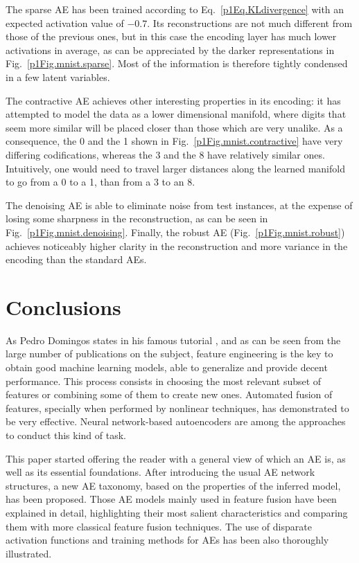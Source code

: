 The sparse AE has been trained according to Eq.~\ref{p1Eq.KLdivergence} with an expected activation value of $-0.7$. Its reconstructions are not much different from those of the previous ones, but in this case the encoding layer has much lower activations in average, as can be appreciated by the darker representations in  Fig.~\ref{p1Fig.mnist.sparse}. Most of the information is therefore tightly condensed in a few latent variables.

The contractive AE achieves other interesting properties in its encoding: it has attempted to model the data as a lower dimensional manifold, where digits that seem more similar will be placed closer than those which are very unalike. As a consequence, the 0 and the 1 shown in Fig.~\ref{p1Fig.mnist.contractive} have very differing codifications, whereas the 3 and the 8 have relatively similar ones. Intuitively, one would need to travel larger distances along the learned manifold to go from a 0 to a 1, than from a 3 to an 8.

The denoising AE is able to eliminate noise from test instances, at the expense of losing some sharpness in the reconstruction, as can be seen in Fig.~\ref{p1Fig.mnist.denoising}. Finally, the robust AE (Fig.~\ref{p1Fig.mnist.robust}) achieves noticeably higher clarity in the reconstruction and more variance in the encoding than the standard AEs.


\section{Conclusions}\label{p1Conclusions}
As Pedro Domingos states in his famous tutorial , and as can be seen from the large number of publications on the subject, feature engineering is the key to obtain good machine learning models, able to generalize and provide decent performance. This process consists in choosing the most relevant subset of features or combining some of them to create new ones. Automated fusion of features, specially when performed by nonlinear techniques, has demonstrated to be very effective. Neural network-based autoencoders are among the approaches to conduct this kind of task.

This paper started offering the reader with a general view of which an AE is, as well as its essential foundations. After introducing the usual AE network structures, a new AE taxonomy, based on the properties of the inferred model, has been proposed. Those AE models mainly used in feature fusion have been explained in detail, highlighting their most salient characteristics and comparing them with more classical feature fusion techniques. The use of disparate activation functions and training methods for AEs has been also thoroughly illustrated. 

